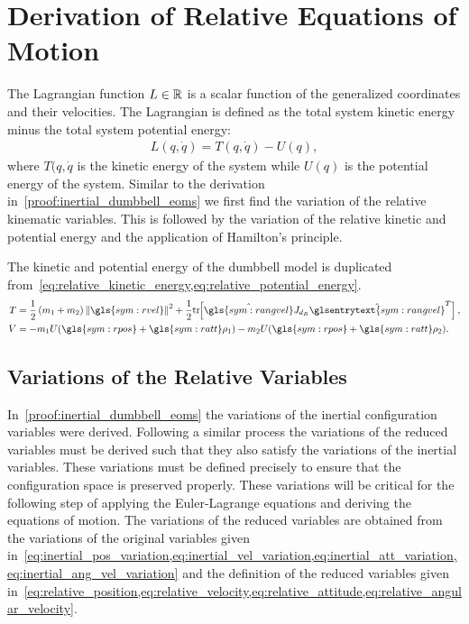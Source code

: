 
\chapter{Derivation of Relative Equations of Motion}\label{proof:relative_dumbbell_eoms}
The Lagrangian function \( L \in \mathbb{R} \) is a scalar function of the generalized coordinates and their velocities.
The Lagrangian is defined as the total system kinetic energy minus the total system potential energy:
\begin{align*}
    L(q, \dot{q} ) = T(q, \dot{q}) - U (q) ,
\end{align*}
where \( T(q, \dot{q} \) is the kinetic energy of the system while \( U(q) \) is the potential energy of the system.
Similar to the derivation in~\cref{proof:inertial_dumbbell_eoms} we first find  the variation of the relative kinematic variables.
This is followed by the variation of the relative kinetic and potential energy and the application of Hamilton's principle.

The kinetic and potential energy of the dumbbell model is duplicated from~\cref{eq:relative_kinetic_energy,eq:relative_potential_energy}.
\begin{align*}
    T &= \frac{1}{2} \parenth{m_1 + m_2} \norm{\gls{sym:rvel}}^2 + \frac{1}{2} \tr{\hat{\gls{sym:rangvel}} J_{d_R} \hat{\glsentrytext{sym:rangvel}}^T},\\
    V &= -m_1 U( \gls{sym:rpos} + \gls{sym:ratt} \vc{\rho}_1) - m_2 U(\gls{sym:rpos} + \gls{sym:ratt} \vc{\rho}_2).
\end{align*}

\section{Variations of the Relative Variables}\label{sec:relative_variations}
In~\cref{proof:inertial_dumbbell_eoms} the variations of the inertial configuration variables were derived.
Following a similar process the variations of the reduced variables must be derived such that they also satisfy the variations of the inertial variables.
These variations must be defined precisely to ensure that the configuration space is preserved properly. 
These variations will be critical for the following step of applying the Euler-Lagrange equations and deriving the equations of motion.
The variations of the reduced variables are obtained from the variations of the original variables given in~\cref{eq:inertial_pos_variation,eq:inertial_vel_variation,eq:inertial_att_variation,eq:inertial_ang_vel_variation} and the definition of the reduced variables given in~\cref{eq:relative_position,eq:relative_velocity,eq:relative_attitude,eq:relative_angular_velocity}.

